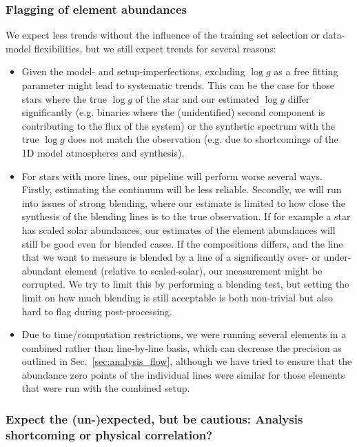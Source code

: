 \documentclass[fleqn,usenatbib,useAMS]{mnras}
\newcommand{\logg}{$\log g$\xspace}
\begin{document}
\subsubsection{Flagging of element abundances}

We expect less trends without the influence of the training set selection or data-model flexibilities, but we still expect trends for several reasons:
\begin{itemize}
\item Given the model- and setup-imperfections, excluding \logg as a free fitting parameter might lead to systematic trends. This can be the case for those stars where the true \logg of the star and our estimated \logg differ significantly (e.g. binaries where the (unidentified) second component is contributing to the flux of the system) or the synthetic spectrum with the true \logg does not match the observation (e.g. due to shortcomings of the 1D model atmospheres and synthesis).
\item For stars with more lines, our pipeline will perform worse several ways. Firstly, estimating the continuum will be less reliable. Secondly, we will run into issues of strong blending, where our estimate is limited to how close the synthesis of the blending lines is to the true observation. If for example a star has scaled solar abundances, our estimates of the element abundances will still be good even for blended cases. If the compositions differs, and the line that we want to measure is blended by a line of a significantly over- or under-abundant element (relative to scaled-solar), our measurement might be corrupted. We try to limit this by performing a blending test, but setting the limit on how much blending is still acceptable is both non-trivial but also hard to flag during post-processing.
\item Due to time/computation restrictions, we were running several elements in a combined rather than line-by-line basis, which can decrease the precision as outlined in Sec.~\ref{sec:analysis_flow}, although we have tried to ensure that the abundance zero points of the individual lines were similar for those elements that were run with the combined setup.
\end{itemize}

\subsubsection{Expect the (un-)expected, but be cautious: Analysis shortcoming or physical correlation?}
\end{document}
